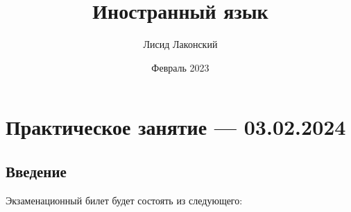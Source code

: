 \documentclass{article}
\title{Иностранный язык}
\author{Лисид Лаконский}
\date{Февраль 2023}
\begin{document}
\raggedright

\maketitle

\tableofcontents
\pagebreak

\section{Практическое занятие — 03.02.2024}

\subsection{Введение}

Экзаменационный билет будет состоять из следующего:
\end{document}
